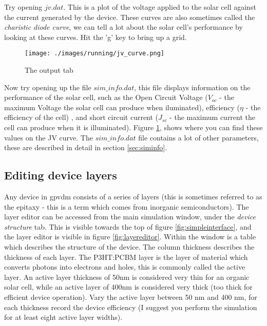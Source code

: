 Try opening $jv.dat$. This is a plot of the voltage applied to the solar cell against the current generated by the device.  These curves are also sometimes called the \emph{charistic diode curve}, we can tell a lot about the solar cell's performance by looking at these curves.  Hit the 'g' key to bring up a grid.

\begin{figure}[H]
\centering
\texttt{[image: ./images/running/jv\_curve.png]}
\caption{The output tab}
\label{fig:jv_curve}
\end{figure}


Now try opening up the file $sim\_info.dat$, this file displays information on the performance of the solar cell, such as the Open Circuit Voltage ($V_{oc}$ - the maximum Voltage the solar cell can produce when iluminated), efficiency ($\eta$ - the efficiency of the cell) , and short circuit current ($J_{sc}$ - the maximum current the cell can produce when it is illuminated).  Figure \ref{fig:jv_curve}, shows where you can find these values on the JV curve.  The $sim\_info.dat$ file contains a lot of other parameters, these are described in detail in section \ref{sec:siminfo}.

\vspace*{\fill}

\subsection{Editing device layers}
\label{sec:layereditor}
Any device in gpvdm consists of a series of layers (this is sometimes referred to as the epitaxy - this is a term which comes from inorganic semiconductors). The layer editor can be accessed from the main simulation window, under the \emph{device structure} tab. This is visible towards the top of figure \ref{fig:simpleinterface}, and the layer editor is visible in figure \ref{fig:layereditor}. Within the window is a table which describes the structure of the device. The column thickness describes the thickness of each layer. The P3HT:PCBM layer is the layer of material which
converts photons into electrons and holes, this is commonly called the active layer. An active layer thickness of 50nm is considered very thin for an organic solar cell, while an active layer of 400nm is considered very thick (too thick for efficient device operation). Vary the active layer between 50 nm and 400 nm, for each thickness record the device efficiency (I suggest you perform the simulation for at least eight active layer widths).



